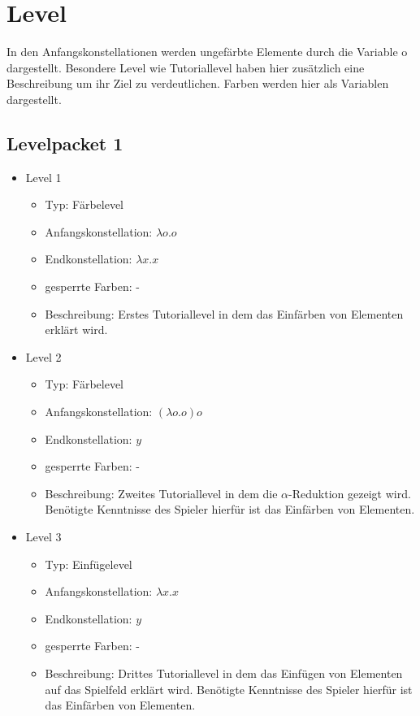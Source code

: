 \chapter{Level}
In den Anfangskonstellationen werden ungefärbte Elemente durch die Variable o dargestellt. 
Besondere Level wie Tutoriallevel haben hier zusätzlich eine Beschreibung um ihr Ziel zu verdeutlichen.
Farben werden hier als Variablen dargestellt.

\section{Levelpacket 1}
\begin{itemize}
	\item{Level 1} 
		\begin{itemize}
			\item{Typ:} Färbelevel 
			\item{Anfangskonstellation:} \(\lambda o . o\)
			\item{Endkonstellation:} \(\lambda x . x\)
			\item{gesperrte Farben:} -  
			\item{Beschreibung:} Erstes Tutoriallevel in dem das Einfärben von Elementen erklärt wird.
		\end{itemize}

	\item{Level 2} 
		\begin{itemize}
			\item{Typ:} Färbelevel 
			\item{Anfangskonstellation:} \((\lambda o . o ) o\)   
			\item{Endkonstellation:} \(y\) 
			\item{gesperrte Farben:} - 
			\item{Beschreibung:} Zweites Tutoriallevel in dem die \(\alpha\)-Reduktion gezeigt wird.
								Benötigte Kenntnisse des Spieler hierfür ist das Einfärben von Elementen. 
		\end{itemize}

	\item{Level 3} 
		\begin{itemize}
			\item{Typ:} Einfügelevel 
			\item{Anfangskonstellation:} \(\lambda x . x \)   
			\item{Endkonstellation:} \(y\)
			\item{gesperrte Farben:} -  
			\item{Beschreibung:} Drittes Tutoriallevel in dem das Einfügen von Elementen auf das Spielfeld erklärt wird.
								Benötigte Kenntnisse des Spieler hierfür ist das Einfärben von Elementen. 
		\end{itemize}


\end{itemize}

